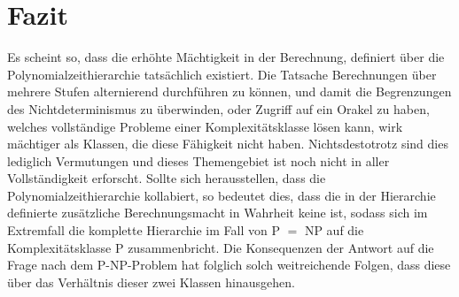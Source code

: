 \chapter{Fazit} \label{chapter: Fazit}
Es scheint so, dass die erhöhte Mächtigkeit in der Berechnung, definiert über die Polynomialzeithierarchie tatsächlich existiert.
Die Tatsache Berechnungen über mehrere Stufen alternierend durchführen zu können, und damit die Begrenzungen des Nichtdeterminismus zu überwinden,
oder Zugriff auf ein Orakel zu haben, welches vollständige Probleme einer Komplexitätsklasse lösen kann, wirk mächtiger als Klassen, die diese Fähigkeit nicht haben.
Nichtsdestotrotz sind dies lediglich Vermutungen und dieses Themengebiet ist noch nicht in aller Vollständigkeit erforscht.
Sollte sich herausstellen, dass die Polynomialzeithierarchie kollabiert, so bedeutet dies, dass die in der Hierarchie definierte zusätzliche Berechnungsmacht 
in Wahrheit keine ist, sodass sich im Extremfall die komplette Hierarchie im Fall von P $=$ NP auf die Komplexitätsklasse P zusammenbricht. Die Konsequenzen der Antwort auf die Frage nach dem P-NP-Problem hat folglich solch weitreichende Folgen, dass diese über das Verhältnis dieser zwei Klassen hinausgehen.